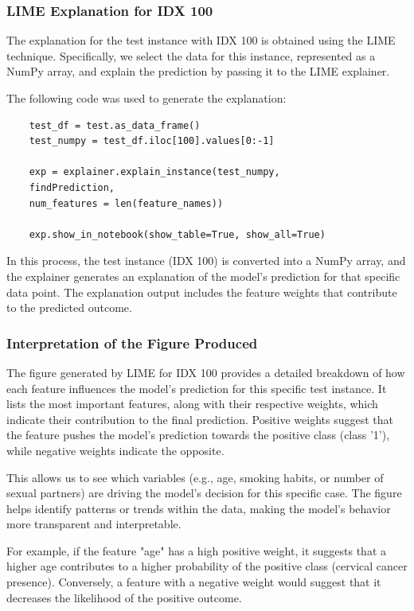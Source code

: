 \documentclass{llncs}
\begin{document}
\subsubsection{LIME Explanation for IDX 100}
The explanation for the test instance with IDX 100 is obtained using the LIME technique. Specifically, we select the data for this instance, represented as a NumPy array, and explain the prediction by passing it to the LIME explainer.

The following code was used to generate the explanation:

\begin{verbatim}
	test_df = test.as_data_frame()
	test_numpy = test_df.iloc[100].values[0:-1]
	
	exp = explainer.explain_instance(test_numpy,
	findPrediction,
	num_features = len(feature_names))
	
	exp.show_in_notebook(show_table=True, show_all=True)
\end{verbatim}

In this process, the test instance (IDX 100) is converted into a NumPy array, and the explainer generates an explanation of the model’s prediction for that specific data point. The explanation output includes the feature weights that contribute to the predicted outcome.

\subsubsection{Interpretation of the Figure Produced}
The figure generated by LIME for IDX 100 provides a detailed breakdown of how each feature influences the model's prediction for this specific test instance. It lists the most important features, along with their respective weights, which indicate their contribution to the final prediction. Positive weights suggest that the feature pushes the model’s prediction towards the positive class (class '1'), while negative weights indicate the opposite. 

This allows us to see which variables (e.g., age, smoking habits, or number of sexual partners) are driving the model’s decision for this specific case. The figure helps identify patterns or trends within the data, making the model's behavior more transparent and interpretable.

For example, if the feature "age" has a high positive weight, it suggests that a higher age contributes to a higher probability of the positive class (cervical cancer presence). Conversely, a feature with a negative weight would suggest that it decreases the likelihood of the positive outcome.
\end{document}
